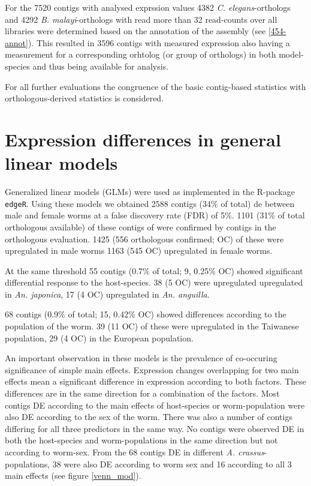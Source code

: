 For the 7520 contigs with analysed exprssion values 4382
\textit{C. elegans}-orthologs and 4292 \textit{B. malayi}-orthologs
with read more than 32 read-counts over all libraries were determined
based on the annotation of the assembly (see \ref{454-annot}). This
resulted in 3596 contigs with measured expression also having a
measurement for a corresponding orhtolog (or group of orthologs) in
both model-species and thus being available for analysis.

For all further evaluations the congruence of the basic contig-based
statistics with orthologous-derived statistics is considered.

\section{Expression differences in general linear models}

Generalized linear models (GLMs) were used as implemented in the
R-package \texttt{edgeR}. Using these models we obtained 2588 contigs
(34\% of total) de between male and female worms at a false discovery
rate (FDR) of 5\%. 1101 (31\% of total orthologous available) of these
contigs of were confirmed by contigs in the orthologous
evaluation. 1425 (556 orthologous confirmed; OC) of these were
upregulated in male worms 1163 (545 OC) upregulated in female worms.

At the same threshold 55 contigs (0.7\% of total; 9, 0.25\% OC) showed
significant differential response to the host-species. 38 (5 OC) were
upregulated upregulated in \textit{An. japonica}, 17 (4 OC)
upregulated in \textit{An. anguilla}.

68 contigs (0.9\% of total; 15, 0.42\% OC) showed differences
according to the population of the worm. 39 (11 OC) of these were
upregulated in the Taiwanese population, 29 (4 OC) in the European
population.

An important observation in these models is the prevalence of
co-occuring significance of simple main effects. Expression changes
overlapping for two main effects mean a significant difference in
expression according to both factors. These differences are in the
same direction for a combination of the factors. Most contigs DE
according to the main effects of host-species or worm-population were
also DE according to the sex of the worm. There was also a number of
contigs differing for all three predictors in the same way. No contigs
were observed DE in both the host-species and worm-populations in the
same direction but not according to worm-sex. From the 68 contigs DE
in different \textit{A. crassus}-populations, 38 were also DE
according to worm sex and 16 according to all 3 main effects (see
figure \ref{venn_mod}).


